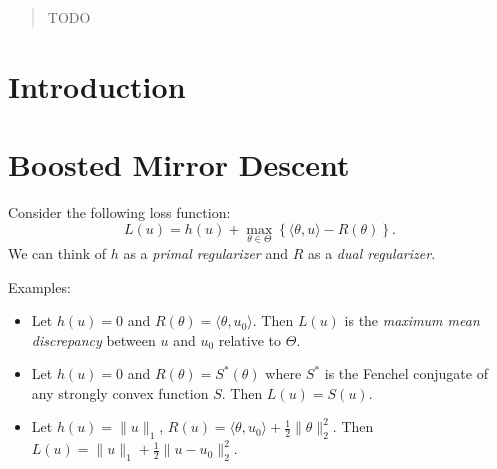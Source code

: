 \documentclass{article}
\begin{document}
 


\begin{abstract} 
TODO
\end{abstract} 

\section{Introduction}
\label{sec:intro}

\section{Boosted Mirror Descent}
\label{sec:algorithm}


Consider the following loss function:
\begin{equation}
L(u) = h(u) + \max_{\theta \in \Theta} \left\{\langle \theta, u \rangle - R(\theta) \right\}.
\end{equation}
We can think of $h$ as a \emph{primal regularizer} and $R$ as a \emph{dual regularizer}. 

Examples:
\begin{itemize}
\item Let $h(u) = 0$ and $R(\theta) = \langle \theta, u_0 \rangle$. Then $L(u)$ is the 
      \emph{maximum mean discrepancy} between $u$ and $u_0$ 
      relative to $\Theta$.
\item Let $h(u) = 0$ and $R(\theta) = S^*(\theta)$ where $S^*$ is the Fenchel conjugate of 
      any strongly convex function $S$. Then $L(u) = S(u)$.
\item Let $h(u) = \|u\|_1$, $R(u) = \langle \theta, u_0 \rangle + \frac{1}{2} \|\theta\|_2^2$. 
      Then $L(u) = \|u\|_1 + \frac{1}{2} \|u-u_0\|_2^2$. 
\end{itemize}
\end{document}
